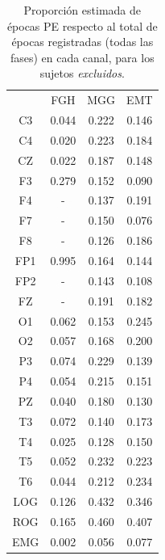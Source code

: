 \begin{table}
\centering
\begin{tabular}{c|ccc}
& FGH & MGG & EMT \\
 C3 & 0.044    & 0.222    & 0.146     \\
 C4 & 0.020    & 0.223    & 0.184     \\
 CZ & 0.022    & 0.187    & 0.148     \\
 F3 & 0.279    & 0.152    & 0.090     \\
 F4 & -      & 0.137    & 0.191     \\
 F7 & -      & 0.150    & 0.076     \\
 F8 & -      & 0.126    & 0.186     \\
 FP1 & 0.995    & 0.164    & 0.144     \\
 FP2 & -      & 0.143    & 0.108     \\
 FZ & -      & 0.191    & 0.182     \\
 O1 & 0.062    & 0.153    & 0.245     \\
 O2 & 0.057    & 0.168    & 0.200     \\
 P3 & 0.074    & 0.229    & 0.139     \\
 P4 & 0.054    & 0.215    & 0.151     \\
 PZ & 0.040    & 0.180    & 0.130     \\
 T3 & 0.072    & 0.140    & 0.173     \\
 T4 & 0.025    & 0.128    & 0.150     \\
 T5 & 0.052    & 0.232    & 0.223     \\
 T6 & 0.044    & 0.212    & 0.234     \\
 LOG & 0.126    & 0.432    & 0.346     \\
 ROG & 0.165    & 0.460    & 0.407     \\
 EMG & 0.002    & 0.056    & 0.077   
\end{tabular}
\caption{Proporci\'on estimada de \'epocas PE respecto al total de \'epocas
registradas (todas las fases) en cada
canal, para los sujetos \textit{excluidos}.}
\label{gpo_zz_tot}
\end{table}

